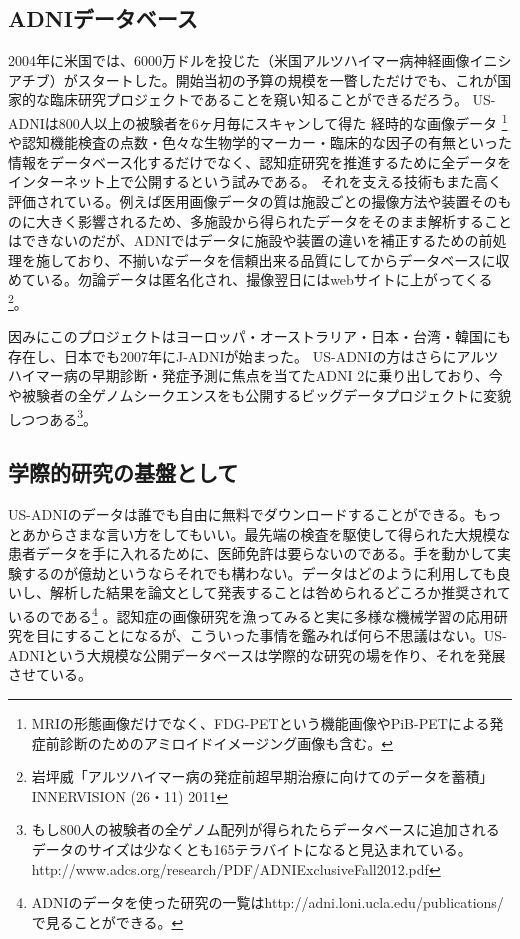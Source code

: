 \subsection{ADNIデータベース}
2004年に米国では、6000万ドルを投じた（米国アルツハイマー病神経画像イニシアチブ）がスタートした。開始当初の予算の規模を一瞥しただけでも、これが国家的な臨床研究プロジェクトであることを窺い知ることができるだろう。
US-ADNIは800人以上の被験者を6ヶ月毎にスキャンして得た
経時的な画像データ
\footnote{
MRIの形態画像だけでなく、FDG-PETという機能画像やPiB-PETによる発症前診断のためのアミロイドイメージング画像も含む。}や認知機能検査の点数・色々な生物学的マーカー・臨床的な因子の有無といった情報をデータベース化するだけでなく、認知症研究を推進するために全データをインターネット上で公開するという試みである。
それを支える技術もまた高く評価されている。例えば医用画像データの質は施設ごとの撮像方法や装置そのものに大きく影響されるため、多施設から得られたデータをそのまま解析することはできないのだが、ADNIではデータに施設や装置の違いを補正するための前処理を施しており、不揃いなデータを信頼出来る品質にしてからデータベースに収めている。勿論データは匿名化され、撮像翌日にはwebサイトに上がってくる\footnote{岩坪威「アルツハイマー病の発症前超早期治療に向けてのデータを蓄積」INNERVISION (26・11) 2011}。

因みにこのプロジェクトはヨーロッパ・オーストラリア・日本・台湾・韓国にも存在し、日本でも2007年にJ-ADNIが始まった。
US-ADNIの方はさらにアルツハイマー病の早期診断・発症予測に焦点を当てたADNI 2に乗り出しており、今や被験者の全ゲノムシークエンスをも公開するビッグデータプロジェクトに変貌しつつある\footnote{もし800人の被験者の全ゲノム配列が得られたらデータベースに追加されるデータのサイズは少なくとも165テラバイトになると見込まれている。http://www.adcs.org/research/PDF/ADNIExclusiveFall2012.pdf}。

\subsection{学際的研究の基盤として}
US-ADNIのデータは誰でも自由に無料でダウンロードすることができる。もっとあからさまな言い方をしてもいい。最先端の検査を駆使して得られた大規模な患者データを手に入れるために、医師免許は要らないのである。手を動かして実験するのが億劫というならそれでも構わない。データはどのように利用しても良いし、解析した結果を論文として発表することは咎められるどころか推奨されているのである\footnote{ADNIのデータを使った研究の一覧はhttp://adni.loni.ucla.edu/publications/で見ることができる。}
。認知症の画像研究を漁ってみると実に多様な機械学習の応用研究を目にすることになるが、こういった事情を鑑みれば何ら不思議はない。US-ADNIという大規模な公開データベースは学際的な研究の場を作り、それを発展させている。

